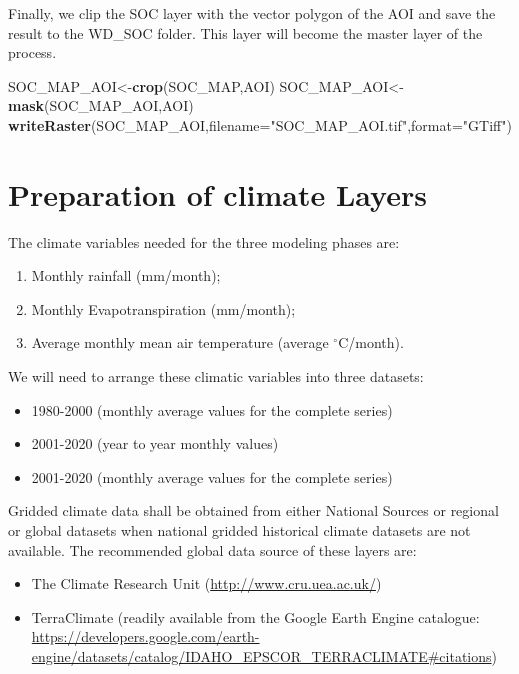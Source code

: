 \documentclass[
  10pt,
  b5paper,
]{book}
\newenvironment{Shaded}{\begin{snugshade}}{\end{snugshade}}
\newcommand{\DataTypeTok}[1]{\textcolor[rgb]{0.13,0.29,0.53}{#1}}
\newcommand{\KeywordTok}[1]{\textcolor[rgb]{0.13,0.29,0.53}{\textbf{#1}}}
\newcommand{\NormalTok}[1]{#1}
\newcommand{\StringTok}[1]{\textcolor[rgb]{0.31,0.60,0.02}{#1}}
\providecommand{\tightlist}{%
  \setlength{\itemsep}{0pt}\setlength{\parskip}{0pt}}
\begin{document}
Finally, we clip the SOC layer with the vector polygon of the AOI and save the result to the WD\_SOC folder. This layer will become the master layer of the process.

\begin{Shaded}
\begin{Highlighting}[]
\NormalTok{SOC_MAP_AOI<-}\KeywordTok{crop}\NormalTok{(SOC_MAP,AOI)}
\NormalTok{SOC_MAP_AOI<-}\KeywordTok{mask}\NormalTok{(SOC_MAP_AOI,AOI)}
\KeywordTok{writeRaster}\NormalTok{(SOC_MAP_AOI,}\DataTypeTok{filename=}\StringTok{"SOC_MAP_AOI.tif"}\NormalTok{,}\DataTypeTok{format=}\StringTok{"GTiff"}\NormalTok{)}
\end{Highlighting}
\end{Shaded}

\hypertarget{preparation-of-climate-layers}{%
\section{Preparation of climate Layers}\label{preparation-of-climate-layers}}

The climate variables needed for the three modeling phases are:

\begin{enumerate}
\def\labelenumi{\arabic{enumi}.}
\tightlist
\item
  Monthly rainfall (mm/month);\\
\item
  Monthly Evapotranspiration (mm/month);
\item
  Average monthly mean air temperature (average \(^\circ\)C/month).
\end{enumerate}

We will need to arrange these climatic variables into three datasets:

\begin{itemize}
\tightlist
\item
  1980-2000 (monthly average values for the complete series)
\item
  2001-2020 (year to year monthly values)
\item
  2001-2020 (monthly average values for the complete series)
\end{itemize}

Gridded climate data shall be obtained from either National Sources or regional or global datasets when national gridded historical climate datasets are not available. The recommended global data source of these layers are:

\begin{itemize}
\tightlist
\item
  The Climate Research Unit (\url{http://www.cru.uea.ac.uk/})
\item
  TerraClimate (readily available from the Google Earth Engine catalogue: \url{https://developers.google.com/earth-engine/datasets/catalog/IDAHO_EPSCOR_TERRACLIMATE\#citations})
\end{itemize}
\end{document}
